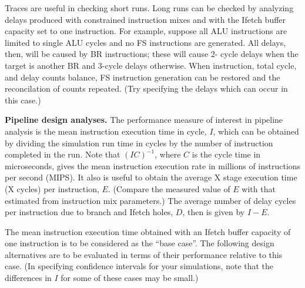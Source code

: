 Traces are useful in checking short runs. Long runs can be checked by
analyzing delays produced with constrained instruction mixes and with the
Ifetch buffer capacity set to one instruction. For example, suppose all ALU
instructions are limited to single ALU cycles and no FS instructions are generated.
All delays, then, will be caused by BR instructions; these will cause 2-
cycle delays when the target is another BR and 3-cycle delays otherwise.
When instruction, total cycle, and delay counts balance, FS instruction generation
can be restored and the reconcilation of counts repeated. (Try specifying
the delays which can occur in this case.)

\noindent\textbf{Pipeline design analyses.} The performance measure of interest in
pipeline analysis is the mean instruction execution time in cycle, $I$, which can
be obtained by dividing the simulation run time in cycles by the number of
instruction completed in the run. Note that $(IC)^{-1}$, where $C$ is the cycle time
in microseconds, gives the mean instruction execution rate in millions of
instructions per second (MIPS). It also is useful to obtain the average X stage
execution time (X cycles) per instruction, $E$. (Compare the measured value of
$E$ with that estimated from instruction mix parameters.) The average
\noindent number of delay cycles per instruction due to branch and Ifetch holes, $D$, then
is given by $I-E$.

The mean instruction execution time obtained with an Ifetch buffer
capacity of one instruction is to be considered as the ``base case''. The
following design alternatives are to be evaluated in terms of their performance
relative to this case. (In specifying confidence intervals for your simulations,
note that the differences in $I$ for some of these cases may be small.)

